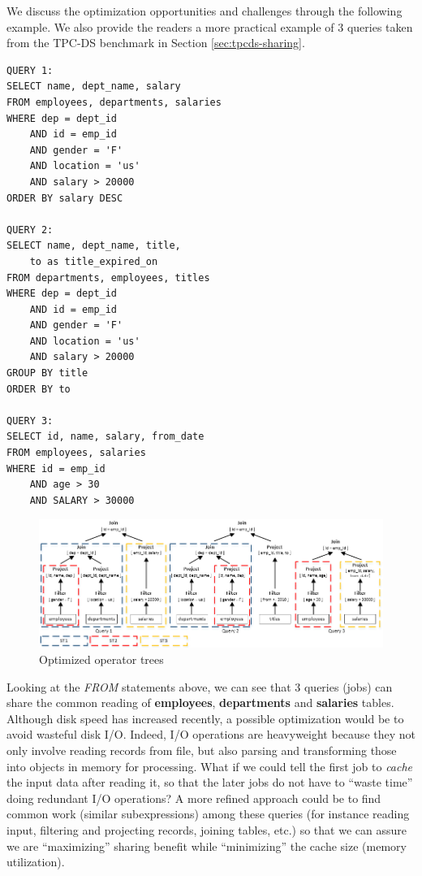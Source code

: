 We discuss the optimization opportunities and challenges through the following example. We also provide the readers a more practical example of 3 queries taken from the TPC-DS benchmark \cite{tpcds} in Section \ref{sec:tpcds-sharing}.

\begingroup
\fontsize{8pt}{9pt}
\selectfont
\begin{verbatim}
QUERY 1:
SELECT name, dept_name, salary
FROM employees, departments, salaries
WHERE dep = dept_id
	AND id = emp_id
	AND gender = 'F'
	AND location = 'us'
	AND salary > 20000
ORDER BY salary DESC

QUERY 2:
SELECT name, dept_name, title, 
	to as title_expired_on
FROM departments, employees, titles
WHERE dep = dept_id
	AND id = emp_id
	AND gender = 'F'
	AND location = 'us'
	AND salary > 20000
GROUP BY title
ORDER BY to

QUERY 3:
SELECT id, name, salary, from_date
FROM employees, salaries
WHERE id = emp_id
	AND age > 30
	AND SALARY > 30000
\end{verbatim}
\endgroup

\begin{figure}[htbp]
	\centering
	\includegraphics[scale=0.65]{figures/common_sub}
	\caption{Optimized operator trees} 
	\label{fig:common_sub}
\end{figure}

Looking at the \emph{FROM} statements above, we can see that 3 queries (jobs) can share the common reading of \textbf{employees}, \textbf{departments} and \textbf{salaries} tables. Although disk speed has increased recently, a possible optimization would be to avoid wasteful disk I/O. Indeed, I/O operations are heavyweight because they not only involve reading records from file, but also parsing and transforming those into objects in memory for processing. What if we could tell the first job to \emph{cache} the input data after reading it, so that the later jobs do not have to ``waste time'' doing redundant I/O operations? A more refined approach could be to find common work (similar subexpressions) among these queries (for instance reading input, filtering and projecting records, joining tables, etc.) so that we can assure we are ``maximizing'' sharing benefit while ``minimizing'' the cache size (memory utilization).

